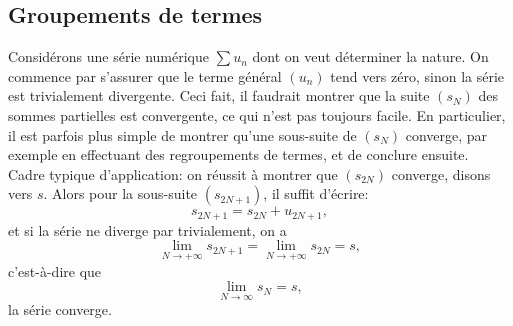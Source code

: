 \subsection{Groupements de termes}

Considérons une série numérique $\sum u_n$ dont on veut déterminer la nature. On commence par s'assurer que le terme général $(u_n)$ tend vers zéro, sinon la série est trivialement divergente. Ceci fait, il faudrait montrer que la suite $(s_N)$ des sommes partielles est convergente, ce qui n'est pas toujours facile. En particulier, il est parfois plus simple de montrer qu'une sous-suite de $(s_N)$ converge, par exemple en effectuant des regroupements de termes, et de conclure ensuite. \\
Cadre typique d'application: on réussit à montrer que $(s_{2N})$ converge, disons vers $s$. Alors pour la sous-suite $(s_{2N+1})$, il suffit d'écrire:
$$s_{2N+1} = s_{2N} + u_{2N+1},$$
et si la série ne diverge par trivialement, on a
$$\lim_{N \to + \infty} s_{2N+1} = \lim_{N \to + \infty} s_{2N} = s,$$
c'est-à-dire que 
$$\lim_{N \to \infty} s_N = s,$$
la série converge. 

